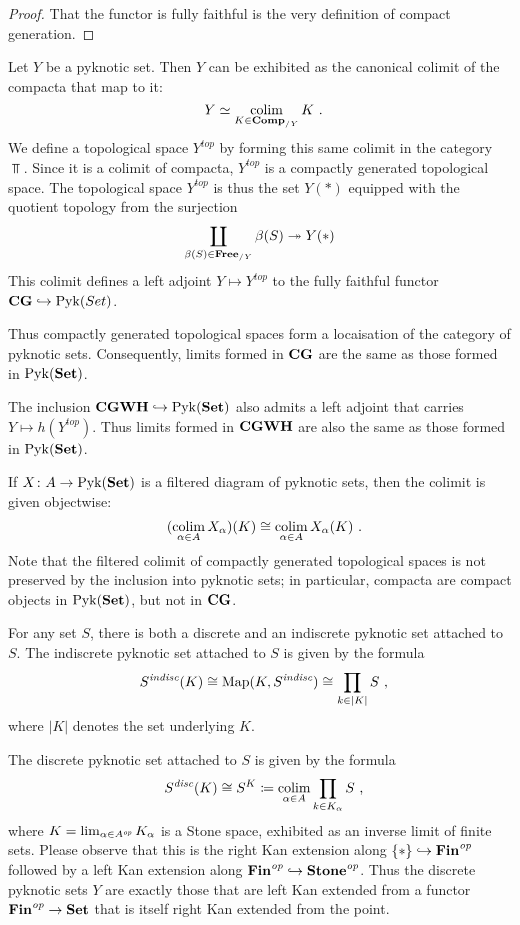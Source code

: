 \begin{proof}
	That the functor is fully faithful is the very definition of compact generation.
\end{proof}

\begin{cnstr}
	Let $ Y $ be a pyknotic set.
	Then $ Y $ can be exhibited as the canonical colimit of the compacta that map to it:
	\[
		Y \simeq \colim_{K \in \Comp_{/Y}} K \period
	\]
	We define a topological space $ Y^{\textit{top}} $ by forming this same colimit in the category $ \Top $.
	Since it is a colimit of compacta, $ Y^{\textit{top}} $ is a compactly generated topological space.
	The topological space $ Y^{\textit{top}} $ is thus the set $ Y(\ast) $ equipped with the quotient topology from the surjection
	\[
		\coprod_{\beta(S) \in \textbf{\textup{Free}}_{/Y}} \beta(S) \twoheadrightarrow Y(\ast)
	\]
	This colimit defines a left adjoint $ Y \mapsto Y^{\textit{top}} $ to the fully faithful functor $ \textbf{\textup{CG}} \hookrightarrow \operatorname{Pyk}(Set) $.

	Thus compactly generated topological spaces form a locaisation of the category of pyknotic sets.
	Consequently, limits formed in $ \textbf{\textup{CG}} $ are the same as those formed in $ \operatorname{Pyk}(\textbf{\textup{Set}}) $.
	
	The inclusion $ \textbf{\textup{CGWH}} \hookrightarrow \operatorname{Pyk}(\textbf{\textup{Set}}) $ also admits a left adjoint that carries $ Y \mapsto h(Y^{\textit{top}}) $.
	Thus limits formed in $ \textbf{\textup{CGWH}} $ are also the same as those formed in $ \operatorname{Pyk}(\textbf{\textup{Set}}) $.
\end{cnstr}

\begin{nul}
	If $ X \colon A \to \operatorname{Pyk}(\textbf{\textup{Set}}) $ is a filtered diagram of pyknotic sets, then the colimit is given objectwise:
	\[
		(\colim_{\alpha \in A} X_{\alpha})(K) \cong \colim_{\alpha \in A} X_{\alpha}(K) \period
	\]
	Note that the filtered colimit of compactly generated topological spaces is not preserved by the inclusion into pyknotic sets;
	in particular, compacta are compact objects in $ \operatorname{Pyk}(\textbf{\textup{Set}}) $, but not in $ \textbf{\textup{CG}} $.
\end{nul}

\begin{exm}
	For any set $ S $, there is both a discrete and an indiscrete pyknotic set attached to $ S $.
	The indiscrete pyknotic set attached to $ S $ is given by the formula
	\[
		S^{\indisc}(K) \cong \Map(K, S^{\indisc}) \cong \prod_{k \in |K|} S \comma
	\]
	where $ |K|$ denotes the set underlying $ K $. 
	
	The discrete pyknotic set attached to $ S $ is given by the formula
	\[
		S^{\disc}(K) \cong S^K \coloneq \colim_{\alpha \in A} \prod_{k \in K_{\alpha}} S \comma
	\]
	where $ K = \lim_{\alpha \in A^{\textit{op}}} K_{\alpha} $ is a Stone space, exhibited as an inverse limit of finite sets.
	Please observe that this is the right Kan extension along $ \{ \ast \} \hookrightarrow \textbf{\textup{Fin}}^{\textit{op}} $ followed by a left Kan extension along $ \textbf{\textup{Fin}}^{\textit{op}} \hookrightarrow \textbf{\textup{Stone}}^{\textit{op}} $.
	Thus the discrete pyknotic sets $ Y $ are exactly those that are left Kan extended from a functor $ \textbf{\textup{Fin}}^{\textit{op}} \to \textbf{\textup{Set}} $ that is itself right Kan extended from the point.
\end{exm}

